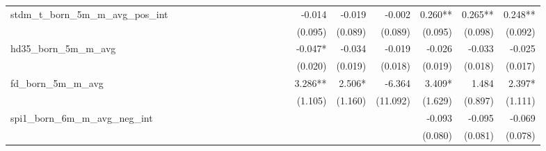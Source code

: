 \begin{tabular}{lrrrrrrrrrrrrrrrrrr}
stdm\_t\_born\_5m\_m\_avg\_pos\_int         &             &             &             &             &             &             &             &             &             &             &             &             &      -0.014 &      -0.019 &      -0.002 &     0.260** &     0.265** &     0.248** \\ 
                                            &             &             &             &             &             &             &             &             &             &             &             &             &     (0.095) &     (0.089) &     (0.089) &     (0.095) &     (0.098) &     (0.092) \\ 
hd35\_born\_5m\_m\_avg                      &             &             &             &             &             &             &             &             &             &             &             &             &     -0.047* &      -0.034 &      -0.019 &      -0.026 &      -0.033 &      -0.025 \\ 
                                            &             &             &             &             &             &             &             &             &             &             &             &             &     (0.020) &     (0.019) &     (0.018) &     (0.019) &     (0.018) &     (0.017) \\ 
fd\_born\_5m\_m\_avg                        &             &             &             &             &             &             &             &             &             &             &             &             &     3.286** &      2.506* &      -6.364 &      3.409* &       1.484 &      2.397* \\ 
                                            &             &             &             &             &             &             &             &             &             &             &             &             &     (1.105) &     (1.160) &    (11.092) &     (1.629) &     (0.897) &     (1.111) \\ 
spi1\_born\_6m\_m\_avg\_neg\_int            &             &             &             &             &             &             &             &             &             &             &             &             &             &             &             &      -0.093 &      -0.095 &      -0.069 \\ 
                                            &             &             &             &             &             &             &             &             &             &             &             &             &             &             &             &     (0.080) &     (0.081) &     (0.078) \\ 

\end{tabular}
